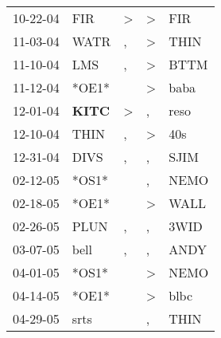 \begin{supertabular}{p{0.07\textwidth}p{0.06\textwidth}p{0.02\textwidth}p{0.02\textwidth}p{0.06\textwidth}}
          10-22-04\textsuperscript{} &            FIR\textsuperscript{} &     \textgreater &     \textgreater &            FIR\textsuperscript{} \\
          11-03-04\textsuperscript{} &           WATR\textsuperscript{} &                , &     \textgreater &           THIN\textsuperscript{} \\
          11-10-04\textsuperscript{} &            LMS\textsuperscript{} &                , &     \textgreater &           BTTM\textsuperscript{} \\
          11-12-04\textsuperscript{} &                            *OE1* &                  &     \textgreater &           baba\textsuperscript{} \\
          12-01-04\textsuperscript{} &  \textbf{KITC\textsuperscript{}} &     \textgreater &                , &           reso\textsuperscript{} \\
          12-10-04\textsuperscript{} &           THIN\textsuperscript{} &                , &     \textgreater &            40s\textsuperscript{} \\
          12-31-04\textsuperscript{} &           DIVS\textsuperscript{} &                , &                , &           SJIM\textsuperscript{} \\
          02-12-05\textsuperscript{} &                            *OS1* &                  &                , &           NEMO\textsuperscript{} \\
          02-18-05\textsuperscript{} &                            *OE1* &                  &     \textgreater &           WALL\textsuperscript{} \\
          02-26-05\textsuperscript{} &           PLUN\textsuperscript{} &                , &                , &           3WID\textsuperscript{} \\
          03-07-05\textsuperscript{} &           bell\textsuperscript{} &                , &                , &           ANDY\textsuperscript{} \\
          04-01-05\textsuperscript{} &                            *OS1* &                  &     \textgreater &           NEMO\textsuperscript{} \\
          04-14-05\textsuperscript{} &                            *OE1* &                  &     \textgreater &           blbc\textsuperscript{} \\
          04-29-05\textsuperscript{} &           srts\textsuperscript{} &                  &                , &           THIN\textsuperscript{} \\

\end{supertabular}

